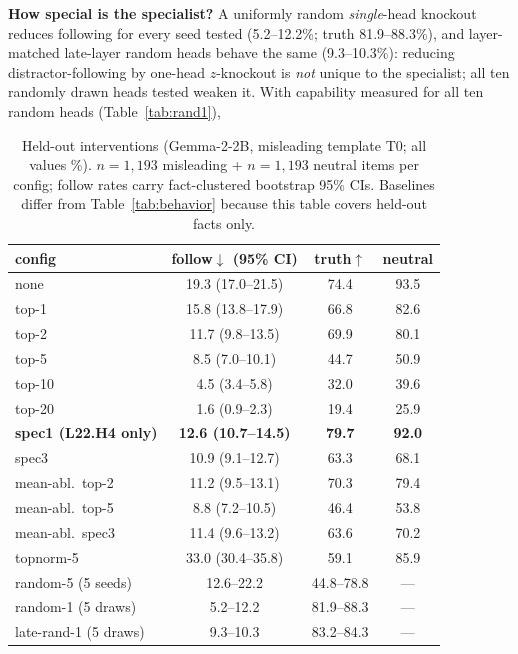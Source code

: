 \documentclass[paper]{ieice}
\newcommand{\emodel}{Gemma-2-2B}
\newcommand{\spec}{L22.H4}
\begin{document}
\textbf{How special is the specialist?} A uniformly random
\emph{single}-head knockout reduces following for every seed tested
(5.2--12.2\%; truth 81.9--88.3\%), and layer-matched late-layer random
heads behave the same (9.3--10.3\%): reducing distractor-following by
one-head $z$-knockout is \emph{not} unique to the specialist; all ten randomly drawn heads
tested weaken it. With capability measured for all ten random heads
(Table~\ref{tab:rand1}), \begin{table}[t]
\caption{Held-out interventions (\emodel{}, misleading template T0; all
values \%). $n{=}1{,}193$ misleading + $n{=}1{,}193$ neutral items per
config; follow rates carry fact-clustered bootstrap 95\% CIs. Baselines
differ from Table~\ref{tab:behavior} because this table covers held-out
facts only.}
\label{tab:dose}
\begin{center}
\begin{tabular}{lccc}
\toprule
config & follow$\downarrow$ (95\% CI) & truth$\uparrow$ & neutral \\
\midrule
none            & 19.3 (17.0--21.5) & 74.4 & 93.5 \\
top-1           & 15.8 (13.8--17.9) & 66.8 & 82.6 \\
top-2           & 11.7 (9.8--13.5)  & 69.9 & 80.1 \\
top-5           & 8.5 (7.0--10.1)   & 44.7 & 50.9 \\
top-10          & 4.5 (3.4--5.8)    & 32.0 & 39.6 \\
top-20          & 1.6 (0.9--2.3)    & 19.4 & 25.9 \\
\textbf{spec1 (\spec{} only)} & \textbf{12.6 (10.7--14.5)} & \textbf{79.7} & \textbf{92.0} \\
spec3           & 10.9 (9.1--12.7)  & 63.3 & 68.1 \\
mean-abl.\ top-2& 11.2 (9.5--13.1)  & 70.3 & 79.4 \\
mean-abl.\ top-5& 8.8 (7.2--10.5)   & 46.4 & 53.8 \\
mean-abl.\ spec3& 11.4 (9.6--13.2)  & 63.6 & 70.2 \\
topnorm-5       & 33.0 (30.4--35.8) & 59.1 & 85.9 \\
random-5 (5 seeds) & 12.6--22.2 & 44.8--78.8 & --- \\
random-1 (5 draws) & 5.2--12.2 & 81.9--88.3 & --- \\
late-rand-1 (5 draws) & 9.3--10.3 & 83.2--84.3 & --- \\
\bottomrule
\end{tabular}
\end{center}
\end{table}
\end{document}
